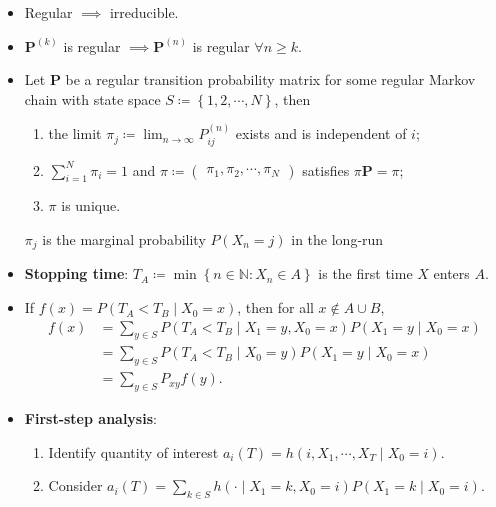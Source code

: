 \documentclass[10pt]{article}
\begin{document}
\begin{multicols*}{2}
\begin{itemize}
            \item Regular $\implies$ irreducible.
            \item $\bm{P}^{\left(k\right)}$ is regular $\implies \bm{P}^{\left(n\right)}$ is regular $\forall n \geq k$.
            \item Let $\bm{P}$ be a regular transition probability matrix for some regular Markov chain with state space $S \coloneqq \left\{1, 2, \cdots, N\right\}$, then 
            \begin{enumerate}
                \item the limit $\pi_j \coloneqq \lim_{n \to \infty}P^{\left(n\right)}_{ij}$ exists and is independent of $i$;
                \item $\sum_{i = 1}^{N}\pi_i = 1$ and $\pi \coloneqq \begin{pmatrix}
                    \pi_1, \pi_2, \cdots, \pi_N
                \end{pmatrix}$ satisfies $\pi\bm{P} = \pi$;
                \item $\pi$ is unique.
            \end{enumerate}
            $\pi_j$ is the marginal probability $P\left(X_n = j\right)$ in the long-run
            \item \textbf{Stopping time}: $T_A \coloneqq \min\left\{n \in \mathbb{N} \colon X_n \in A\right\}$ is the first time $X$ enters $A$.
            \item If $f\left(x\right) = P\left(T_A < T_B \mid X_0 = x\right)$, then for all $x \notin A \cup B$,
            \begin{align*}
                f\left(x\right) & = \sum_{y \in S}P\left(T_A < T_B \mid X_1 = y, X_0 = x\right)P\left(X_1 = y \mid X_0 = x\right) \\
                & = \sum_{y \in S}P\left(T_A < T_B \mid X_0 = y\right)P\left(X_1 = y \mid X_0 = x\right) \\
                & = \sum_{y \in S}P_{xy}f\left(y\right).
            \end{align*}
            \item \textbf{First-step analysis}:
            \begin{enumerate}
                \item Identify quantity of interest $a_i\left(T\right) = h\left(i, X_1, \cdots, X_T \mid X_0 = i\right)$.
                \item Consider $a_i\left(T\right) = \sum_{k \in S}h\left(\cdot \mid X_1 = k, X_0 = i\right)P\left(X_1 = k \mid X_0 = i\right)$.

\end{enumerate}
\end{itemize}
\end{multicols*}
\end{document}
